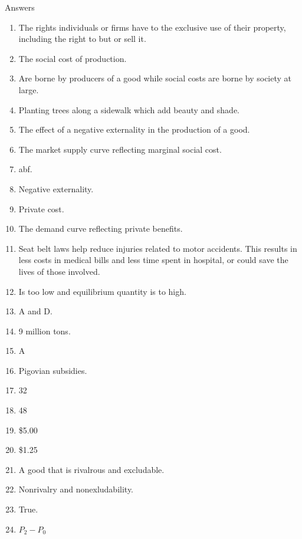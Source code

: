\begin{center}
    Answers
\end{center}
\begin{enumerate}
    \item The rights individuals or firms have to the exclusive use of their property, including the right to but or sell it.
    \item The social cost of production.
    \item Are borne by producers of a good while social costs are borne by society at large.
    \item Planting trees along a sidewalk which add beauty and shade.
    \item The effect of a negative externality in the production of a good.
    \item The market supply curve reflecting marginal social cost.
    \item abf.
    \item Negative externality.
    \item Private cost.
    \item The demand curve reflecting private benefits.
    \item Seat belt laws help reduce injuries related to motor accidents.
    This results in less costs in medical bills and less time spent in hospital, or could save the lives of those involved.
    \item Is too low and equilibrium quantity is to high.
    \item A and D.
    \item 9 million tons.
    \item A
    \item Pigovian subsidies.
    \item 32
    \item 48
    \item \$5.00
    \item \$1.25
    \item A good that is rivalrous and excludable.
    \item Nonrivalry and nonexludability.
    \item True.
    \item $P_2 - P_0$
\end{enumerate}